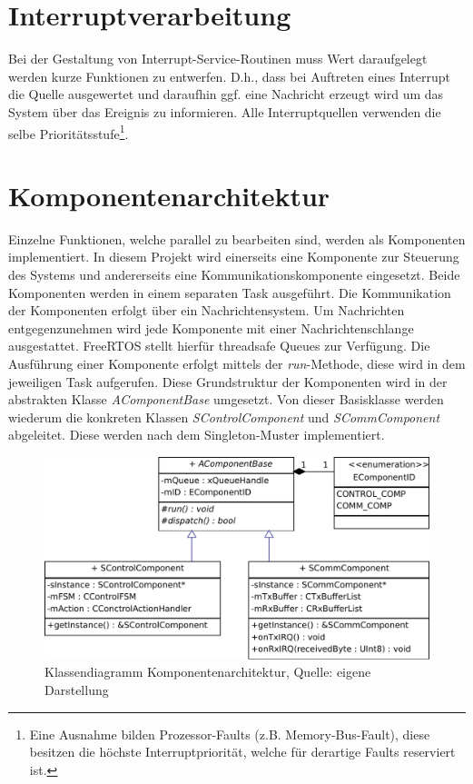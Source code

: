 \documentclass{article}
\begin{document}
\section{Interruptverarbeitung}
Bei der Gestaltung von Interrupt-Service-Routinen muss Wert daraufgelegt werden kurze Funktionen zu entwerfen. D.h., dass bei Auftreten eines Interrupt die Quelle ausgewertet und daraufhin ggf. eine Nachricht erzeugt wird um das System über das Ereignis zu informieren. Alle Interruptquellen verwenden die selbe Prioritätsstufe\footnote{Eine Ausnahme bilden Prozessor-Faults (z.B. Memory-Bus-Fault), diese besitzen die höchste Interruptpriorität, welche für derartige Faults reserviert ist.}.

\newpage

\section{Komponentenarchitektur}
Einzelne Funktionen, welche parallel zu bearbeiten sind, werden als Komponenten implementiert. In diesem Projekt wird einerseits eine Komponente zur Steuerung des Systems und andererseits eine Kommunikationskomponente eingesetzt. Beide Komponenten werden in einem separaten Task ausgeführt. 
Die Kommunikation der Komponenten erfolgt über ein Nachrichtensystem. Um Nachrichten entgegenzunehmen wird jede Komponente mit einer Nachrichtenschlange ausgestattet. FreeRTOS stellt hierfür threadsafe Queues zur Verfügung.
Die Ausführung einer Komponente erfolgt mittels der \textit{run}-Methode, diese wird in dem jeweiligen Task aufgerufen. Diese Grundstruktur der Komponenten wird in der abstrakten Klasse \textit{AComponentBase} umgesetzt. Von dieser Basisklasse werden wiederum die konkreten Klassen \textit{SControlComponent} und \textit{SCommComponent} abgeleitet. Diese werden nach dem Singleton-Muster implementiert.

\begin{figure}[h]
	\includegraphics[width=\linewidth]{Komponentenarchitektur}
	\caption{Klassendiagramm Komponentenarchitektur, Quelle: eigene Darstellung}
\end{figure}
\end{document}
